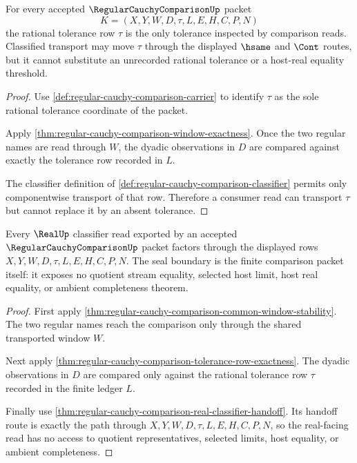 \begin{theorem}
\label{thm:regular-cauchy-comparison-tolerance-row-exactness}
For every accepted $\RegularCauchyComparisonUp$ packet
$$
K=(X,Y,W,D,\tau,L,E,H,C,P,N)
$$
the rational tolerance row $\tau$ is the only tolerance inspected by
comparison reads. Classified transport may move $\tau$ through the displayed
$\hsame$ and $\Cont$ routes, but it cannot substitute an unrecorded rational
tolerance or a host-real equality threshold.
\end{theorem}
\begin{proof}
Use \autoref{def:regular-cauchy-comparison-carrier} to identify $\tau$ as the
sole rational tolerance coordinate of the packet.

Apply \autoref{thm:regular-cauchy-comparison-window-exactness}. Once the two
regular names are read through $W$, the dyadic observations in $D$ are compared
against exactly the tolerance row recorded in $L$.

The classifier definition of
\autoref{def:regular-cauchy-comparison-classifier} permits only componentwise
transport of that row. Therefore a consumer read can transport $\tau$ but
cannot replace it by an absent tolerance.
\end{proof}

\begin{theorem}
\label{thm:regular-cauchy-comparison-real-seal-boundary}
Every $\RealUp$ classifier read exported by an accepted
$\RegularCauchyComparisonUp$ packet factors through the displayed rows
$X,Y,W,D,\tau,L,E,H,C,P,N$. The seal boundary is the finite comparison packet
itself: it exposes no quotient stream equality, selected host limit, host real
equality, or ambient completeness theorem.
\end{theorem}
\begin{proof}
First apply
\autoref{thm:regular-cauchy-comparison-common-window-stability}. The two
regular names reach the comparison only through the shared transported window
$W$.

Next apply
\autoref{thm:regular-cauchy-comparison-tolerance-row-exactness}. The dyadic
observations in $D$ are compared only against the rational tolerance row
$\tau$ recorded in the finite ledger $L$.

Finally use
\autoref{thm:regular-cauchy-comparison-real-classifier-handoff}. Its handoff
route is exactly the path through $X,Y,W,D,\tau,L,E,H,C,P,N$, so the
real-facing read has no access to quotient representatives, selected limits,
host equality, or ambient completeness.
\end{proof}

